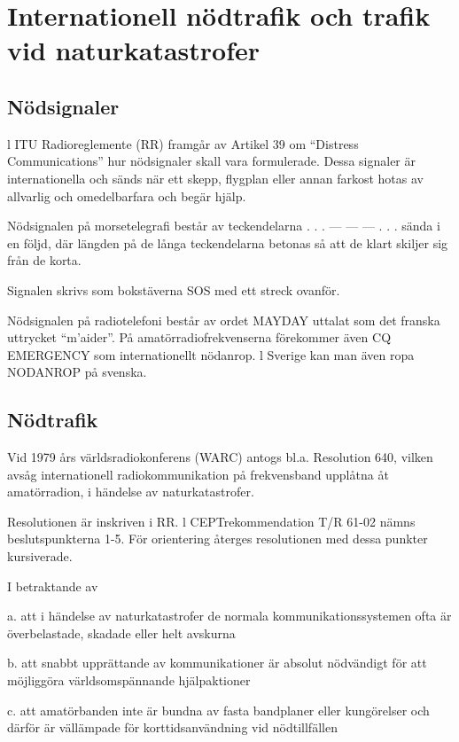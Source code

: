 \section{Internationell nödtrafik och trafik vid naturkatastrofer}

\subsection{Nödsignaler}

l ITU Radioreglemente (RR) framgår av Artikel 39 om ``Distress Communications''
hur nödsignaler skall vara formulerade. Dessa signaler är internationella och
sänds när ett skepp, flygplan eller annan farkost hotas av allvarlig och
omedelbarfara och begär hjälp.

Nödsignalen på morsetelegrafi består av teckendelarna . . . --- --- --- . . .
sända i en följd, där längden på de långa teckendelarna betonas så att de klart
skiljer sig från de korta.

Signalen skrivs som bokstäverna SOS med ett streck ovanför.

Nödsignalen på radiotelefoni består av ordet MAYDAY uttalat som det franska
uttrycket ``m'aider''.  På amatörradiofrekvenserna förekommer även CQ EMERGENCY
som internationellt nödanrop. l Sverige kan man även ropa NODANROP på svenska.

\subsection{Nödtrafik}

Vid 1979 års världsradiokonferens (WARC) antogs bl.a. Resolution 640, vilken
avsåg internationell radiokommunikation på frekvensband upplåtna åt
amatörradion, i händelse av naturkatastrofer.

Resolutionen är inskriven i RR. l CEPTrekommendation T/R 61-02 nämns
beslutspunkterna 1-5. För orientering återges resolutionen med dessa punkter
kursiverade.

I betraktande av

a. att i händelse av naturkatastrofer de normala kommunikationssystemen ofta är
överbelastade, skadade eller helt avskurna

b. att snabbt upprättande av kommunikationer är absolut nödvändigt för att
möjliggöra världsomspännande hjälpaktioner

c. att amatörbanden inte är bundna av fasta bandplaner eller kungörelser och
därför är vällämpade för korttidsanvändning vid nödtillfällen

